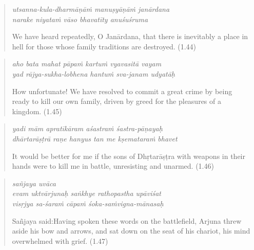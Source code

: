 \documentclass[12pt, twoside, openright]{memoir}
\begin{document}
\par
\begin{verse}
\textit{utsanna-kula-dharmāṇāṁ manuṣyāṇāṁ janārdana} \\
\textit{narake niyataṁ vāso bhavatīty anuśuśruma}

\noindent We have heard repeatedly, O Janārdana, that there is inevitably a place in hell for those whose family traditions are destroyed. (1.44)
\end{verse}
\par



\par
\begin{verse}
\textit{aho bata mahat pāpaṁ kartuṁ vyavasitā vayam} \\
\textit{yad rājya-sukha-lobhena hantuṁ sva-janam udyatāḥ}

\noindent How unfortunate! We have resolved to commit a great crime by being ready to kill our own family, driven by greed for the pleasures of a kingdom. (1.45)
\end{verse}
\par



\par
\begin{verse}
\textit{yadi mām apratīkāram aśastraṁ śastra-pāṇayaḥ} \\
\textit{dhārtarāṣṭrā raṇe hanyus tan me kṣemataraṁ bhavet}

\noindent It would be better for me if the sons of Dhṛtarāṣṭra with weapons in their hands were to kill me in battle, unresisting and unarmed. (1.46)
\end{verse}
\par




\par
\begin{verse}
\textit{sañjaya uvāca} \\
\textit{evam uktvārjunaḥ saṅkhye rathopastha upāviśat} \\
\textit{visṛjya sa-śaraṁ cāpaṁ śoka-saṁvigna-mānasaḥ}

\noindent \quad Sañjaya said:\linebreak Having spoken these words on the battlefield, Arjuna threw aside his bow and arrows, and sat down on the seat of his chariot, his mind overwhelmed with grief. (1.47)
\end{verse}
\par
\end{document}
